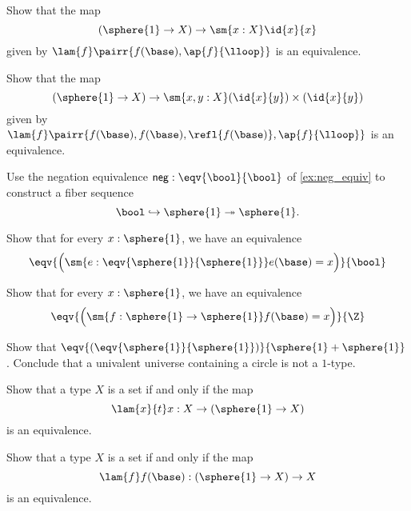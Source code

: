 \begin{exercises}
\item Show that the map
\begin{equation*}
(\sphere{1}\to X)\to \sm{x:X}\id{x}{x}
\end{equation*}
given by $\lam{f}\pairr{f(\base),\ap{f}{\lloop}}$ is an equivalence.
\item Show that the map
\begin{equation*}
(\sphere{1}\to X)\to \sm{x,y:X} (\id{x}{y})\times(\id{x}{y})
\end{equation*}
given by $\lam{f}\pairr{f(\base),f(\base),\refl{f(\base)},\ap{f}{\lloop}}$ is an equivalence.
\item Use the negation equivalence $\mathsf{neg}:\eqv{\bool}{\bool}$ of \autoref{ex:neg_equiv} to construct a fiber sequence
\begin{equation*}
\bool\hookrightarrow \sphere{1}\twoheadrightarrow \sphere{1}.
\end{equation*}
\item 
\begin{subexenum}
\item Show that for every $x:\sphere{1}$, we have an equivalence
\begin{equation*}
\eqv{\Big(\sm{e:\eqv{\sphere{1}}{\sphere{1}}}e(\base)= x \Big)}{\bool}
\end{equation*}
\item Show that for every $x:\sphere{1}$, we have an equivalence
\begin{equation*}
\eqv{\Big(\sm{f:\sphere{1}\to \sphere{1}}f(\base)= x \Big)}{\Z}
\end{equation*}
\end{subexenum}
\item Show that $\eqv{(\eqv{\sphere{1}}{\sphere{1}})}{\sphere{1}+\sphere{1}}$. Conclude that a univalent universe containing a circle is not a $1$-type.
\item 
\begin{subexenum}
\item Show that a type $X$ is a set if and only if the map
\begin{equation*}
\lam{x}{t} x : X \to (\sphere{1}\to X)
\end{equation*}
is an equivalence.
\item Show that a type $X$ is a set if and only if the map
\begin{equation*}
\lam{f}f(\base) : (\sphere{1}\to X)\to X
\end{equation*}
is an equivalence.
\end{subexenum}
\end{exercises}
